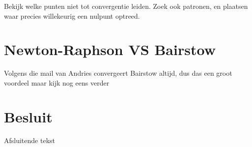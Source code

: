 \documentclass[a4paper,kulak]{kulakarticle}
\begin{document}
Bekijk welke punten niet tot convergentie leiden.
Zoek ook patronen, en plaatsen waar precies willekeurig een nulpunt optreed.

\section{Newton-Raphson VS Bairstow}

Volgens die mail van Andries convergeert Bairstow altijd, dus das een groot voordeel maar kijk nog eens verder

\section*{Besluit}

Afsluitende tekst




\end{document}
